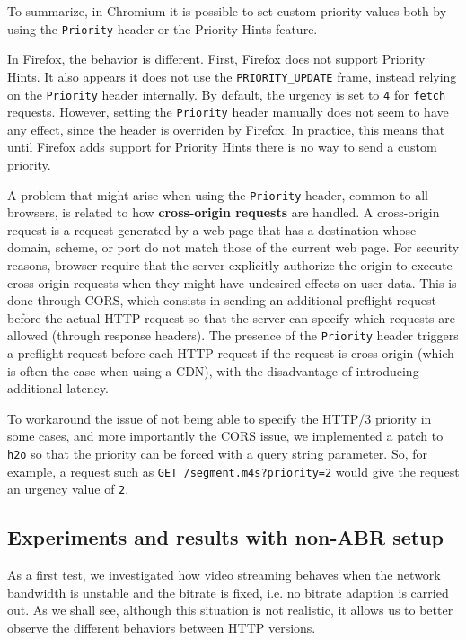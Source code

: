 To summarize, in Chromium it is possible to set custom priority values both by using the \texttt{Priority} header or the Priority Hints feature.

In Firefox, the behavior is different. First, Firefox does not support Priority Hints. It also appears it does not use the \texttt{PRIORITY\_UPDATE} frame, instead relying on the \texttt{Priority} header internally. By default, the urgency is set to \texttt{4} for \texttt{fetch} requests. However, setting the \texttt{Priority} header manually does not seem to have any effect, since the header is overriden by Firefox. In practice, this means that until Firefox adds support for Priority Hints there is no way to send a custom priority.

A problem that might arise when using the \texttt{Priority} header, common to all browsers, is related to how \textbf{cross-origin requests} are handled. A cross-origin request is a request generated by a web page that has a destination whose domain, scheme, or port do not match those of the current web page. For security reasons, browser require that the server explicitly authorize the origin to execute cross-origin requests when they might have undesired effects on user data. This is done through CORS, which consists in sending an additional preflight request before the actual HTTP request so that the server can specify which requests are allowed (through response headers). The presence of the \texttt{Priority} header triggers a preflight request before each HTTP request if the request is cross-origin (which is often the case when using a CDN), with the disadvantage of introducing additional latency.

To workaround the issue of not being able to specify the HTTP/3 priority in some cases, and more importantly the CORS issue, we implemented a patch to \texttt{h2o} so that the priority can be forced with a query string parameter. So, for example, a request such as \texttt{GET /segment.m4s?priority=2} would give the request an urgency value of \texttt{2}.

\subsection{Experiments and results with non-ABR setup}
\label{sec:eval/non-abr}

As a first test, we investigated how video streaming behaves when the network bandwidth is unstable and the bitrate is fixed, i.e. no bitrate adaption is carried out. As we shall see, although this situation is not realistic, it allows us to better observe the different behaviors between HTTP versions.


